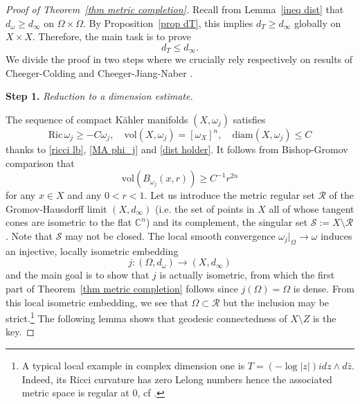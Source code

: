 \documentclass[a4paper,11pt,leqno,english]{smfart}
\theoremstyle{plain}
\theoremstyle{plain}
\numberwithin{equation}{section} %
\numberwithin{figure}{section} %
\theoremstyle{plain}
\theoremstyle{plain}
\theoremstyle{remark}
\theoremstyle{remark}
\theoremstyle{definition}
\theoremstyle{plain}
\theoremstyle{plain}
\theoremstyle{definition}
\newcommand{\cS}{{\mathcal{S}}}
\newcommand{\Ric}{\mathrm{Ric} \,}
\newcommand{\cR}{\mathcal R}
\renewcommand{\ge}{\geq}
\renewcommand{\le}{\leq}
\begin{document}
\begin{proof}[Proof of Theorem~\ref{thm metric completion}]

Recall from Lemma~\ref{ineq dist} that   $d_\omega \ge d_\infty$ on $\Omega\times \Omega$. By Proposition~\ref{prop dT}, this implies $d_T\ge d_\infty$ globally on $X\times X$. Therefore, the main task is to prove
\begin{equation}
\label{reverse ineq}
d_T \le d_{\infty}.
\end{equation}
We divide the proof in two steps where we crucially rely respectively on results of Cheeger-Colding \cite{CCII} and Cheeger-Jiang-Naber \cite{CJN}. 

\bigskip

{\bf Step 1. } {\it Reduction to a dimension estimate.}

\medskip

The sequence of compact Kähler manifolds $(X, \omega_j)$ satisfies
\begin{equation}
\label{geom bounds}
\Ric \omega_j \ge -C\omega_j, \quad \mathrm{vol}(X,\omega_j)=[\omega_X]^n, \quad \mathrm{diam}(X,\omega_j) \le C
\end{equation}
thanks to \eqref{ricci lb}, \eqref{MA phi_j} and \eqref{dist holder}. 
It follows from Bishop-Gromov comparison that 
\begin{equation}
\label{non collapse}
\mathrm{vol}(B_{\omega_j}(x,r))\ge C^{-1} r^{2n}
\end{equation}
for any $x\in X$ and any $0<r<1$. Let us introduce the metric regular set $\cR$ of the Gromov-Hausdorff limit $(X,d_\infty)$ (i.e. the set of points in $X$ all of whose tangent cones are isometric to the flat $\mathbb C^n$) and its complement, the singular set $\cS:=X\setminus\cR$. Note that $\cS$ may not be closed. The local smooth convergence $\omega_j|_{\Omega}\to \omega$ induces an injective, locally isometric embedding 
\[j:(\Omega, d_\omega)\longrightarrow (X,d_\infty)\]
and the main goal is to show that $j$ is actually isometric, from which the first part of Theorem~\ref{thm metric completion} follows since $j(\Omega)=\Omega$ is dense. From this local isometric embedding, we see that $\Omega\subset \cR$ but the inclusion may be 
strict.\footnote{
A typical local example in complex dimension one
is $T=(-\log |z|) idz\wedge d\bar z$. Indeed, its Ricci curvature has zero Lelong numbers hence the associated metric space is regular at $0$, cf \cite[Proposition~4.1]{LS18}.
} 
The following lemma shows that geodesic connectedness of $X\setminus Z$ is the key. 


\end{proof}
\end{document}
